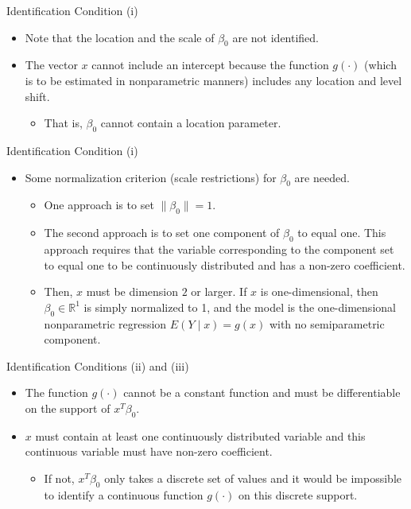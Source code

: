 \documentclass[xcolor=svgnames,dvipdfmx,cjk]{beamer}
\theoremstyle{example}
\begin{document}
\begin{frame}{Identification Condition (i)}
\begin{itemize}
  \item Note that \alert{the location and the scale of $\beta_0$ are not identified}.
  \item The vector $x$ cannot include an intercept 
        because the function $g(\cdot)$ (which is to be estimated in nonparametric manners) includes any location and level shift.
        \begin{itemize}
          \item That is, $\beta_0$ cannot contain a location parameter.
        \end{itemize}
\end{itemize}
\end{frame}

\begin{frame}{Identification Condition (i)}
  \begin{itemize}
    \item Some normalization criterion (scale restrictions) for $\beta_0$ are needed.
          \begin{itemize}
            \item One approach is to set $\| \beta_0 \| =1$.
            \item The second approach is to set one component of $\beta_0$ to equal one. 
                  This approach requires that 
                  the variable corresponding to the component set to equal one 
                  to be continuously distributed 
                  and has a non-zero coefficient.
            \item Then, $x$ must be dimension $2$ or larger. 
                  If $x$ is one-dimensional, then $\beta_0 \in \mathbb{R}^1$ is simply normalized to 1, 
                  and the model is the one-dimensional nonparametric regression $E(Y \mid x) = g(x)$ with no semiparametric component.
          \end{itemize}
  \end{itemize}
  
\end{frame}

\begin{frame}{Identification Conditions (ii) and (iii)}
\begin{itemize}
  \item The function $g(\cdot)$ cannot be a constant function and must be differentiable on the support of $x^{T}\beta_0$.
  \item $x$ must contain at least one continuously distributed variable
        and this continuous variable must have non-zero coefficient.
        \begin{itemize}
          \item  If not, $x^{T} \beta_0$ only takes a discrete set of values and it would be impossible to identify a continuous function $g(\cdot)$ on this discrete support.
        \end{itemize}
\end{itemize}
\end{frame}
\end{document}
